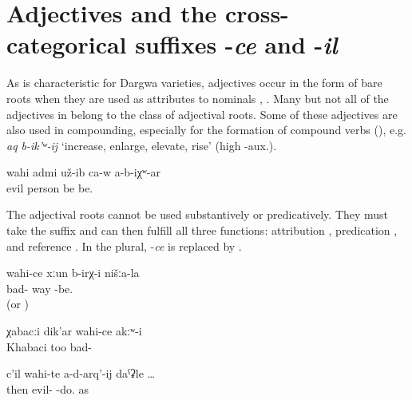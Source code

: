 
\section{Adjectives and the cross-categorical suffixes -\textit{ce} and -\textit{il}}
\label{sec:adjmorphclasses} 

As is characteristic for Dargwa varieties, adjectives occur in the form of bare roots when they are used as attributes to nominals , . Many but not all of the adjectives in  belong to the class of adjectival roots. Some of these adjectives are also used in compounding, especially for the formation of compound verbs (), e.g. \textit{aq b-ik'ʷ-ij} `increase, enlarge, elevate, rise' (high -aux.).
%
\begin{exe}
	\ex	\label{ex:Probably he was a bad person}
	\gll	wahi	admi	už-ib ca-w	a-b-iχʷ-ar \\
		evil	person	be 	be.\\
	\glt	{}
\end{exe}

The adjectival roots cannot be used substantively or predicatively. They must take the suffix  and can then fulfill all three functions: attribution , predication ,  and reference . In the plural, -\textit{ce} is replaced by  .
%
\begin{exe}
	\ex	\label{ex:We had a bad road}
	\gll	wahi-ce	xːun	b-irχ-i	nišːa-la\\
		bad-	way	-be.	\\
	\glt	{} (or )

	\ex	\label{ex:Khabaci was also not bad_1}
	\gll	χabacːi	dik'ar	wahi-ce	akːʷ-i \\
		Khabaci	too	bad-	\\
	\glt	{}

	\ex	\label{ex:then like in order not to do bad} {
	\gll	c'il	wahi-te	a-d-arq'-ij	daˁʡle	\ldots\\
		then	evil- 	-do. as\\
	\glt	{}}
\end{exe}

